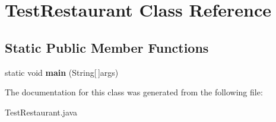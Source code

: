 \hypertarget{class_test_restaurant}{}\section{Test\+Restaurant Class Reference}
\label{class_test_restaurant}
\subsection*{Static Public Member Functions}
\begin{DoxyCompactItemize}
\item 
static void {\bfseries main} (String\mbox{[}$\,$\mbox{]}args)\hypertarget{class_test_restaurant_a331f5f114d4b9d314f27f6da07e3726c}{}\label{class_test_restaurant_a331f5f114d4b9d314f27f6da07e3726c}

\end{DoxyCompactItemize}


The documentation for this class was generated from the following file\+:\begin{DoxyCompactItemize}
\item 
Test\+Restaurant.\+java\end{DoxyCompactItemize}
